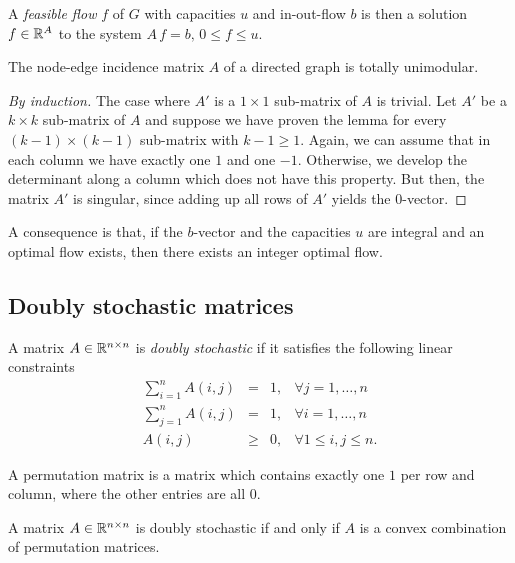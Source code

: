 A \emph{feasible flow} $f$  of $G$ with capacities $u$ and in-out-flow $b$ is then
a solution $f \in \mathbb{R}^A$ to the system $A\,f=b, \, 0\leq f\leq u$.  

\begin{lemma}
  \label{po:lem:10}
  The node-edge incidence matrix $A$ of a directed graph  is totally
  unimodular.  
\end{lemma}


\begin{proof}[By induction]
  The case where $A'$ is a $1 \times 1$ sub-matrix of $A$ is 
  trivial. Let $A'$ be a $k\times k$ sub-matrix of $A$ and suppose 
  we have proven the lemma for every 
  $(k-1) \times (k-1)$ sub-matrix with $k-1 \geq 1$. 
  Again, we can assume 
  that in each column we have exactly one $1$ and one $-1$. 
  Otherwise, we develop the determinant along a column which does not 
  have this property.  But then, the matrix $A'$ is singular, 
  since adding 
  up all rows of $A'$ yields the $0$-vector. 
\end{proof}
  

A consequence is that, if the $b$-vector and the capacities $u$ are
integral and an optimal flow exists, then there exists an integer
optimal flow. 





\subsection{Doubly stochastic matrices}


A matrix $A \in \mathbb{R}^{n\times n}$ is \emph{doubly stochastic} if it satisfies
the following linear constraints 
\begin{equation}
  \label{po:eq:9}
  \begin{array}{rcll}
    \sum_{i=1}^n A(i,j) & = & 1, & \forall j=1,\ldots,n\\
    \sum_{j=1}^n A(i,j) & = & 1, & \forall i=1,\ldots,n\\
    A(i,j)       & \geq & 0, & \forall 1 \leq i,j\leq n.
  \end{array}
\end{equation}

A permutation matrix is a matrix which contains exactly one $1$ per
row and column, where the other entries are all $0$. 

\begin{theorem}
  \label{po:thr:17}
  A matrix $A \in \mathbb{R}^{n\times n}$ is doubly stochastic if and only if $A$ is
  a  convex combination  of permutation matrices. 
\end{theorem}

